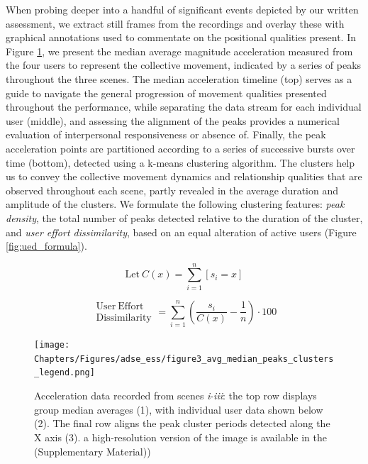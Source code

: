When probing deeper into a handful of significant events depicted by our written assessment, we extract still frames from the recordings and overlay these with graphical annotations used to commentate on the positional qualities present. In Figure \ref{fig:sensor_data}, we present the median average magnitude acceleration measured from the four users to represent the collective movement, indicated by a series of peaks throughout the three scenes. The median acceleration timeline (top) serves as a guide to navigate the general progression of movement qualities presented throughout the performance, while separating the data stream for each individual user (middle), and assessing the alignment of the peaks provides a numerical evaluation of interpersonal responsiveness or absence of. Finally, the peak acceleration points are partitioned according to a series of successive bursts over time (bottom), detected using a k-means clustering algorithm. The clusters help us to convey the collective movement dynamics and relationship qualities that are observed throughout each scene, partly revealed in the average duration and amplitude of the clusters. We formulate the following clustering features: \textit{peak density}, the total number of peaks detected relative to the duration of the cluster, and \textit{user effort dissimilarity}, based on an equal alteration of active users (Figure \ref{fig:ued_formula}).

\begin{figure}
\[
 \mathrm{Let}\ C(x)=\sum_{i=1}^{n}[s_i=x]
\]

\begin{equation}
\begin{split}
\mathrm{User\ Effort\ }\\ \mathrm{Dissimilarity}
\end{split}
= \sum_{i=1}^{n} (\frac{s_i}{C(x)} - \frac{1}{n})\cdot100
\end{equation}
\end{figure}

\begin{adjustwidth}{-9cm}{}
\begin{figure}[!h]
\centering
\texttt{[image: Chapters/Figures/adse\_ess/figure3\_avg\_median\_peaks\_clusters\_legend.png]}
\caption[Acceleration data recorded from scenes]{Acceleration data recorded from scenes \textit{i}-\textit{iii}: the top row displays group median averages (1), with individual user data shown below (2). The final row aligns the peak cluster periods detected along the X axis (3).
a high-resolution version of the image is available in the (Supplementary Material))}\label{fig:sensor_data}
\vspace*{-20pt}
\end{figure}
\end{adjustwidth}

